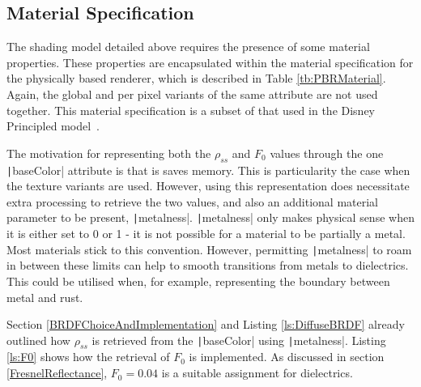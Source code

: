 
\subsection{Material Specification} \label{PBRMaterialSpecification}

The shading model detailed above requires the presence of some material properties. These properties are encapsulated within the material specification for the physically based renderer, which is described in Table \ref{tb:PBRMaterial}. Again, the global and per pixel variants of the same attribute are not used together. This material specification is a subset of that used in the Disney Principled model~\cite{Burley2012Physically}.

The motivation for representing both the \begin{math}\rho_{ss}\end{math} and \begin{math}F_0\end{math} values through the one \texttt|baseColor| attribute is that is saves memory. This is particularity the case when the texture variants are used.  However, using this representation does necessitate extra processing to retrieve the two values, and also an additional material parameter to be present, \texttt|metalness|. \texttt|metalness| only makes physical sense when it is either set to 0 or 1 - it is not possible for a material to be partially a metal. Most materials stick to this convention. However, permitting \texttt|metalness| to roam in between these limits can help to smooth transitions from metals to dielectrics. This could be utilised when, for example, representing the boundary between metal and rust.

Section \ref{BRDFChoiceAndImplementation} and Listing \ref{ls:DiffuseBRDF} already outlined how \begin{math}\rho_{ss}\end{math} is retrieved from the \texttt|baseColor| using \texttt|metalness|. Listing \ref{ls:F0} shows how the retrieval of \begin{math}F_0\end{math} is implemented. As discussed in section \ref{FresnelReflectance}, \begin{math}F_0 = 0.04\end{math} is a suitable assignment for dielectrics.

